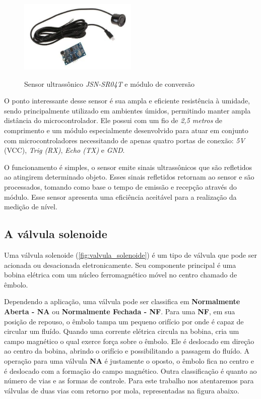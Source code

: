 \begin{figure}[H]
	\centering
	\caption{Sensor ultrassônico \textit{JSN-SR04T} e módulo de conversão}
	\includegraphics[width=0.5\textwidth]{figuras/sensor_ultra.jpg}
	\label{fig:sensor_ultra}
\end{figure}

O ponto interessante desse sensor é sua ampla e eficiente resistência à umidade, sendo principalmente utilizado em ambientes úmidos, permitindo manter ampla distância do microcontrolador. Ele possui com um fio de \textit{2,5 metros} de comprimento e um módulo especialmente desenvolvido para atuar em conjunto com microcontroladores necessitando de apenas quatro portas de conexão: \textit{5V} (VCC), \textit{Trig (RX)}, \textit{Echo (TX)} e \textit{GND}.

O funcionamento é simples, o sensor emite sinais ultrassônicos que são refletidos ao atingirem determinado objeto. Esses sinais refletidos retornam ao sensor e são processados, tomando como base o tempo de emissão e recepção através do módulo. Esse sensor apresenta uma eficiência aceitável para a realização da medição de nível.

\subsection{A válvula solenoide}

Uma válvula solenoide (\autoref{fig:valvula_solenoide}) é um tipo de válvula que pode ser acionada ou desacionada eletronicamente. Seu componente principal é uma bobina elétrica com um núcleo ferromagnético móvel no centro chamado de êmbolo.

Dependendo a aplicação, uma válvula pode ser classifica em \textbf{Normalmente Aberta - NA} ou\textbf{ Normalmente Fechada - NF}. Para uma \textbf{NF}, em sua posição de repouso, o êmbolo tampa um pequeno orifício por onde é capaz de circular um fluído. Quando uma corrente elétrica circula na bobina, cria um campo magnético o qual exerce força sobre o êmbolo. Ele é deslocado em direção ao centro da bobina, abrindo o orifício e possibilitando a passagem do fluído. A operação para uma válvula \textbf{NA} é justamente o oposto, o êmbolo fica no centro e é deslocado com a formação do campo magnético. Outra classificação é quanto ao número de vias e as formas de controle. Para este trabalho nos atentaremos para válvulas de duas vias com retorno por mola, representadas na figura abaixo.

